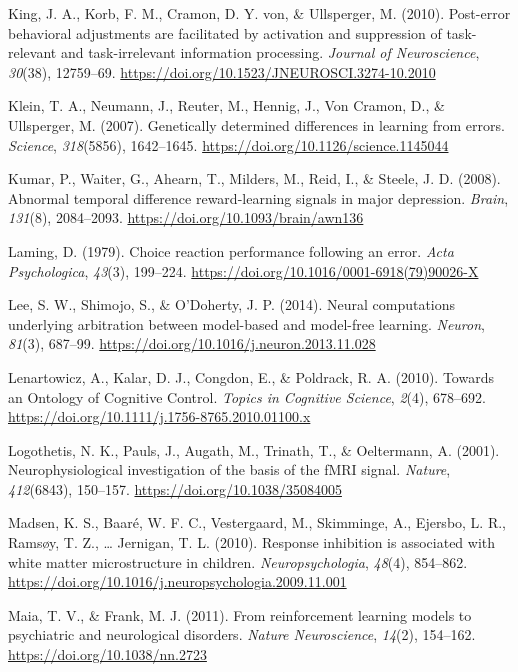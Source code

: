 \documentclass[12pt,openany]{book}
\theoremstyle{definition}
\theoremstyle{definition}
\theoremstyle{definition}
\theoremstyle{remark}
\begin{document}
\hypertarget{ref-King2010}{}
King, J. A., Korb, F. M., Cramon, D. Y. von, \& Ullsperger, M. (2010).
Post-error behavioral adjustments are facilitated by activation and
suppression of task-relevant and task-irrelevant information processing.
\emph{Journal of Neuroscience}, \emph{30}(38), 12759--69.
\url{https://doi.org/10.1523/JNEUROSCI.3274-10.2010}

\hypertarget{ref-Klein2007}{}
Klein, T. A., Neumann, J., Reuter, M., Hennig, J., Von Cramon, D., \&
Ullsperger, M. (2007). Genetically determined differences in learning
from errors. \emph{Science}, \emph{318}(5856), 1642--1645.
\url{https://doi.org/10.1126/science.1145044}

\hypertarget{ref-Kumar2008}{}
Kumar, P., Waiter, G., Ahearn, T., Milders, M., Reid, I., \& Steele, J.
D. (2008). Abnormal temporal difference reward-learning signals in major
depression. \emph{Brain}, \emph{131}(8), 2084--2093.
\url{https://doi.org/10.1093/brain/awn136}

\hypertarget{ref-Laming1979}{}
Laming, D. (1979). Choice reaction performance following an error.
\emph{Acta Psychologica}, \emph{43}(3), 199--224.
\url{https://doi.org/10.1016/0001-6918(79)90026-X}

\hypertarget{ref-Lee2014}{}
Lee, S. W., Shimojo, S., \& O'Doherty, J. P. (2014). Neural computations
underlying arbitration between model-based and model-free learning.
\emph{Neuron}, \emph{81}(3), 687--99.
\url{https://doi.org/10.1016/j.neuron.2013.11.028}

\hypertarget{ref-Lenartowicz2010}{}
Lenartowicz, A., Kalar, D. J., Congdon, E., \& Poldrack, R. A. (2010).
Towards an Ontology of Cognitive Control. \emph{Topics in Cognitive
Science}, \emph{2}(4), 678--692.
\url{https://doi.org/10.1111/j.1756-8765.2010.01100.x}

\hypertarget{ref-Logothetis2001}{}
Logothetis, N. K., Pauls, J., Augath, M., Trinath, T., \& Oeltermann, A.
(2001). Neurophysiological investigation of the basis of the fMRI
signal. \emph{Nature}, \emph{412}(6843), 150--157.
\url{https://doi.org/10.1038/35084005}

\hypertarget{ref-Madsen2010}{}
Madsen, K. S., Baaré, W. F. C., Vestergaard, M., Skimminge, A., Ejersbo,
L. R., Ramsøy, T. Z., \ldots{} Jernigan, T. L. (2010). Response
inhibition is associated with white matter microstructure in children.
\emph{Neuropsychologia}, \emph{48}(4), 854--862.
\url{https://doi.org/10.1016/j.neuropsychologia.2009.11.001}

\hypertarget{ref-Maia2011}{}
Maia, T. V., \& Frank, M. J. (2011). From reinforcement learning models
to psychiatric and neurological disorders. \emph{Nature Neuroscience},
\emph{14}(2), 154--162. \url{https://doi.org/10.1038/nn.2723}
\end{document}
